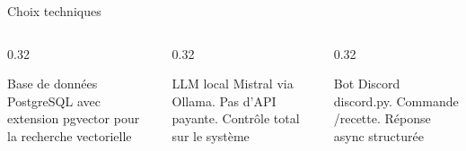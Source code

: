 \documentclass[aspectratio=169]{beamer}
\begin{document}
\begin{frame}{Choix techniques}
\begin{columns}[T]
\begin{column}{0.32\textwidth}
  \begin{exampleblock}{Base de donn\'ees}
    \footnotesize
    PostgreSQL avec extension pgvector pour la recherche vectorielle
  \end{exampleblock}
\end{column}
\begin{column}{0.32\textwidth}
  \begin{exampleblock}{LLM local}
    \footnotesize
    Mistral via Ollama. Pas d'API payante. Contr\^ole total sur le syst\`eme
  \end{exampleblock}
\end{column}
\begin{column}{0.32\textwidth}
  \begin{exampleblock}{Bot Discord}
    \footnotesize
    discord.py. Commande /recette. R\'eponse async structur\'ee
  \end{exampleblock}
\end{column}
\end{columns}

\vspace{0.5cm}
\begin{center}
\end{center}
\end{frame}

\end{document}
